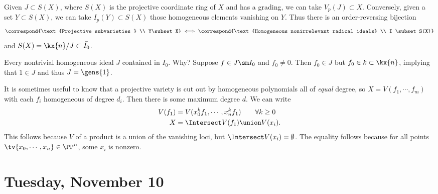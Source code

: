 \begin{remark}

Given \(J\subset S(X)\), where \(S(X)\) is the projective coordinate
ring of \(X\) and has a grading, we can take \(V_p(J) \subset X\).
Conversely, given a set \(Y\subset S(X)\), we can take
\(I_p(Y) \subset S(X)\) those homogeneous elements vanishing on \(Y\).
Thus there is an order-reversing bijection
\begin{align*}  
\correspond{\text{Projective subvarieties } \\ Y\subset X}
\iff
\correspond{\text{Homogeneous nonirrelevant radical ideals} \\ I \subset S(X)}
\end{align*} and \(S(X) = \kx{n}/J \subset \bar{I_0}\).

\end{remark}

\begin{remark}

Every nontrivial homogeneous ideal \(J\) contained in \(I_0\). Why?
Suppose \(f\in J\sm I_0\) and \(f_0\neq 0\). Then \(f_0\in J\) but
\(f_0\in k\subset \kx{n}\), implying that \(1\in J\) and thus
\(J = \gens{1}\).

\end{remark}

\begin{remark}

It is sometimes useful to know that a projective variety is cut out by
homogeneous polynomials all of \emph{equal} degree, so
\(X = V (f_1, \cdots, f_m)\) with each \(f_i\) homogeneous of degree
\(d_i\). Then there is some maximum degree \(d\). We can write
\begin{align*}  
V(f_1) &= V(x_0^k f_1, \cdots, x_n^k f_1 ) \qquad \forall k\geq 0 \\
X &= \Intersect V(f_1) \union V(x_i)
.\end{align*} This follows because \(V\) of a product is a union of the
vanishing loci, but \(\Intersect V(x_i) = \emptyset\). The equality
follows because for all points \(\tv{x_0, \cdots, x_n} \in \PP^n\), some
\(x_i\) is nonzero.

\end{remark}

\hypertarget{tuesday-november-10}{%
\section{Tuesday, November 10}\label{tuesday-november-10}}

